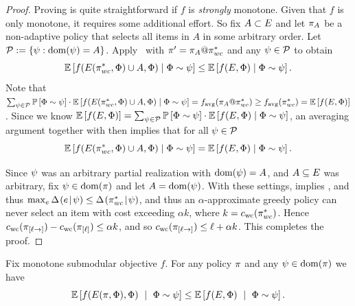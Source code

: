 \begin{proof}
Proving  is quite straightforward if $f$ is \emph{strongly} \term
monotone.  Given that $f$ is only \term
monotone, it requires some additional effort.
So fix $A \subset \groundset$ and let $\policy_{A}$ be a non-adaptive policy that selects all
items in $A$ in some arbitrary order.
Let $\prlzset := \set{\prlz : \dom(\prlz) = A}$.
Apply~ with $\policy' =
\append{\policy_{A}}{\policy_{wc}^*}$ and any $\prlz \in \prlzset$ 
to obtain 
\begin{equation}
  \label{eq:3app-wc}
  \expct{f(\played{\policy_{wc}^*}{\rvrlz} \cup
  A, \rvrlz)  \mid  \rvrlz \sim \prlz} \le \expct{f(\groundset,
  \rvrlz)   \mid  \rvrlz \sim \prlz}. 
%
\end{equation}
Note that $\sum_{\prlz \in \prlzset} \Pr{\rvrlz \sim \prlz} \cdot \expct{f(\played{\policy_{wc}^*}{\rvrlz} \cup
  A, \rvrlz)  \mid  \rvrlz \sim \prlz} =
\avgf(\append{\policy_{A}}{\policy_{wc}^*}) \ge \avgf(\policy_{wc}^*)
= \expct{f(\groundset,\rvrlz)  }$.
Since we know 
%
$\expct{f(\groundset,\rvrlz)} = \sum_{\prlz \in \prlzset} \Pr{\rvrlz \sim \prlz} \cdot \expct{f(\groundset,\rvrlz)   \mid  \rvrlz \sim \prlz}$, 
an averaging argument together with  
then implies that for all $\prlz \in \prlzset$
\begin{equation}
  \label{eq:4app-wc}
  \expct{f(\played{\policy_{wc}^*}{\rvrlz} \cup
 A, \rvrlz)  \mid  \rvrlz \sim \prlz} = \expct{f(\groundset,
  \rvrlz)  \mid \rvrlz \sim \prlz}. 
%
%
\end{equation}

Since $\prlz$ was an arbitrary partial realization with $\dom(\prlz) =
A$, and $A \subseteq \groundset$ was arbitrary, 
fix $\prlz \in \dom(\policy)$ and let $A = \dom(\prlz)$.
%
With these settings,  implies 
, and thus $\max_e \diff{\prlz}{e} \le
\diff{\prlz}{ \policy_{wc}^* }$, and thus an $\alpha$-approximate greedy policy
can never select an item with cost exceeding $\alpha k$, where 
$k = \wcst{\policy_{wc}^*}$.  Hence 
$\wcst{\laxprune{\policy}{\ell}} - \wcst{\prune{\policy}{\ell}} \le
\alpha k$, and so $\wcst{\laxprune{\policy}{\ell}} \le \ell + \alpha k$.
This completes the proof.
%
%
%
%
%
%
%
%
%
%
%
%
%
%
%
%
\end{proof}

\begin{lemma} \label{lem:pick-all-bound}
Fix \term monotone submodular objective $f$.
For any policy $\policy$ and any $\prlz \in \dom(\policy)$ we have 
$$\expct{f(\played{\policy}{\rvrlz}, \rvrlz)\  \mid \ \rvrlz \sim \prlz} \le \expct{f(\groundset,
  \rvrlz) \  \mid \ \rvrlz \sim \prlz}.$$  
\end{lemma}

